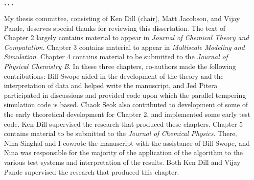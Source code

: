 \begin{center}
${\mbox{\boldmath{$\cdots$}}}$
\end{center}

My thesis committee, consisting of Ken Dill (chair), Matt Jacobson, and Vijay Pande, deserves special thanks for reviewing this dissertation.  
The text of Chapter 2 largely contains material to appear in \emph{Journal of Chemical Theory and Computation}.
Chapter 3 contains material to appear in \emph{Multiscale Modeling and Simulation}.
Chapter 4 contains material to be submitted to the \emph{Journal of Physical Chemistry B}.
In these three chapters, co-authors made the following contributions: Bill Swope aided in the development of the theory and the interpretation of data and helped write the manuscript, and Jed Pitera participated in discussions and provided code upon which the parallel tempering simulation code is based.
Chaok Seok also contributed to development of some of the early theoretical development for Chapter 2, and implemented some early test code.
Ken Dill supervised the research that produced these chapters.
Chapter 5 contains material to be submitted to the \emph{Journal of Chemical Physics}.
There, Nina Singhal and I cowrote the manuscript with the assistance of Bill Swope, and Nina was responsible for the majority of the application of the algorithm to the various test systems and interpretation of the results.
Both Ken Dill and Vijay Pande supervised the research that produced this chapter.
